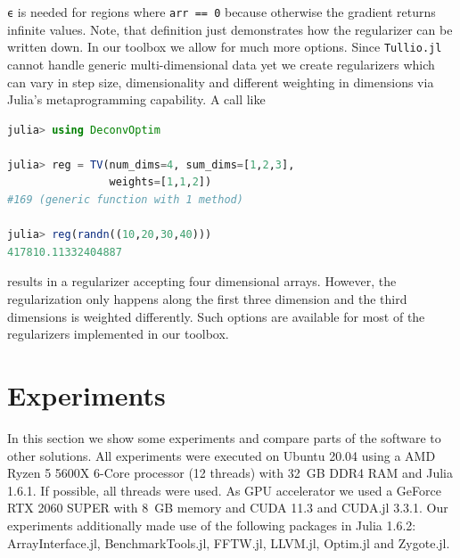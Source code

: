\documentclass{juliacon}
\begin{document}
        \lstinline{ϵ} is needed for regions where \lstinline{arr == 0} because otherwise the gradient returns infinite values.
        Note, that definition just demonstrates how the regularizer can be written down.
        In our toolbox we allow for much more options. Since \verb|Tullio.jl| cannot handle generic multi-dimensional data yet
        we create regularizers which can vary in step size, dimensionality and
        different weighting in dimensions via Julia's metaprogramming capability.
        A call like 
        \begin{lstlisting}[language = Julia]
julia> using DeconvOptim

julia> reg = TV(num_dims=4, sum_dims=[1,2,3],
                weights=[1,1,2])
#169 (generic function with 1 method)

julia> reg(randn((10,20,30,40)))
417810.11332404887
        \end{lstlisting}
        results in a regularizer accepting four dimensional arrays. However, the regularization only happens along the first three dimension
        and the third dimensions is weighted differently.
        Such options are available for most of the regularizers implemented in our toolbox.

\section{Experiments}
    In this section we show some experiments and compare parts of the software to other solutions.
    All experiments were executed on Ubuntu 20.04 using a AMD Ryzen 5 5600X 6-Core processor (12 threads) with \SI{32}{GB} DDR4 RAM and Julia 1.6.1.
    If possible, all threads were used.
    As GPU accelerator we used a GeForce RTX 2060 SUPER with \SI{8}{GB} memory and CUDA 11.3 and CUDA.jl 3.3.1.
    Our experiments additionally made use of the following packages in Julia 1.6.2: ArrayInterface.jl\cite{DifferentialEquations.jl-2017}, 
    BenchmarkTools.jl\cite{BenchmarkTools.jl-2016}, FFTW.jl\cite{FFTW05}, LLVM.jl\cite{LLVM.jl-2017}, Optim.jl\cite{mogensen2018optim}
    and  Zygote.jl\cite{Zygote.jl-2018}. 
\end{document}
